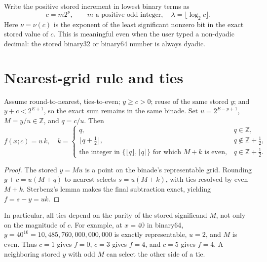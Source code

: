 Write the positive stored increment in lowest binary terms as
\begin{equation}\label{eq:nu}
 c=m2^{\nu},\qquad m\text{ a positive odd integer},\quad
 \lambda=\lfloor\log_2 c\rfloor.
\end{equation}
Here $\nu=\nu(c)$ is the exponent of the least significant nonzero bit in the exact stored value of $c$. This is meaningful even when the user typed a non-dyadic decimal: the stored binary32 or binary64 number is always dyadic.

\section{Nearest-grid rule and ties}
\begin{proposition}\label{prop:grid}
Assume round-to-nearest, ties-to-even; $y\ge c>0$; reuse of the same stored $y$; and $y+c<2^{E+1}$, so the exact sum remains in the same binade. Set $u=2^{E-p+1}$, $M=y/u\in\mathbb{Z}$, and $q=c/u$. Then
\begin{equation}\label{eq:grid}
 f(x;c)=u\,k,\quad k=\begin{cases}
 q, & q\in\mathbb{Z},\\
 \lfloor q+\tfrac12\rfloor,&q\notin\mathbb{Z}+\tfrac12,\\
 \text{the integer in }\{\lfloor q\rfloor,\lceil q\rceil\}
 \text{ for which }M+k\text{ is even}, &q\in\mathbb{Z}+\tfrac12.
 \end{cases}
\end{equation}
\end{proposition}
\begin{proof}
The stored $y=Mu$ is a point on the binade's representable grid. Rounding $y+c=u(M+q)$ to nearest selects $s=u(M+k)$, with ties resolved by even $M+k$. Sterbenz's lemma makes the final subtraction exact, yielding $f=s-y=uk$.
\end{proof}

In particular, all ties depend on the parity of the stored significand $M$, not only on the magnitude of $c$. For example, at $x=40$ in binary64, $y=40^{10}=10{,}485{,}760{,}000{,}000{,}000$ is exactly representable, $u=2$, and $M$ is even. Thus $c=1$ gives $f=0$, $c=3$ gives $f=4$, and $c=5$ gives $f=4$. A neighboring stored $y$ with odd $M$ can select the other side of a tie.

